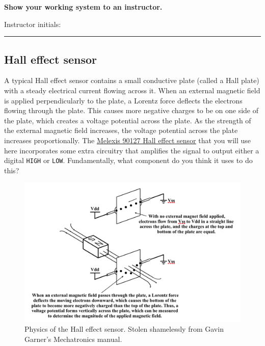 \documentclass[11pt]{article} %
\begin{document}
{\bf Show your working system to an instructor.}

\vspace{0.25in}
Instructor initials: \rule{2in}{0.4pt}
\vspace{0.25in}

\subsection*{Hall effect sensor}

A typical Hall effect sensor contains a small conductive plate (called a Hall plate) with a steady electrical current flowing across it. When an external magnetic field is applied perpendicularly to the plate, a Lorentz force deflects the electrons flowing through the plate. This causes more negative charges to be on one side of the plate, which creates a voltage potential across the plate. As the strength of the external magnetic field increases, the voltage potential across the plate increases proportionally. The \href{https://www.parallax.com/sites/default/files/downloads/605-00005-MLX90217-Datasheet.pdf}{\underline{Melexis 90127 Hall effect sensor}} that you will use here incorporates some extra circuitry that amplifies the signal to output either a digital \verb|HIGH| or \verb|LOW|. Fundamentally, what component do you think it uses to do this?

\begin{figure}[htbp]
\begin{center}
\includegraphics[width=5.5in]{figures/hall_effect}
\caption{Physics of the Hall effect sensor. Stolen shamelessly from Gavin Garner’s Mechatronics manual.}
\label{fig:hall.effect.physics}
\end{center}
\end{figure}
%
\end{document}
